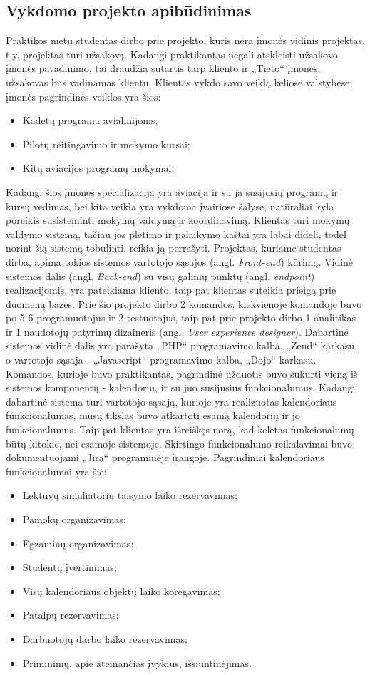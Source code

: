 \documentclass{VUMIFPSbakalaurinis}
\begin{document}
\subsection{Vykdomo projekto apibūdinimas}
Praktikos metu studentas dirbo prie projekto, kuris nėra įmonės vidinis projektas, t.y. projektas turi užsakovą. Kadangi praktikantas negali atskleisti užsakovo įmonės pavadinimo, tai draudžia sutartis tarp kliento ir „Tieto“ įmonės, užsakovas bus vadinamas klientu. Klientas vykdo savo veiklą keliose valstybėse, įmonės pagrindinės veiklos yra šios:
\begin{itemize}
    \item Kadetų programa avialinijoms;
    \item Pilotų reitingavimo ir mokymo kursai;
    \item Kitų aviacijos programų mokymai;
\end{itemize}
Kadangi šios įmonės specializacija yra aviacija ir su ja susijusių programų ir kursų vedimas, bei kita veikla yra vykdoma įvairiose šalyse, natūraliai kyla poreikis susisteminti mokymų valdymą ir koordinavimą. Klientas turi mokymų valdymo sistemą, tačiau jos plėtimo ir palaikymo kaštai yra labai dideli, todėl norint šią sistemą tobulinti, reikia ją perrašyti. Projektas, kuriame studentas dirba, apima tokios sistemos vartotojo sąsajos (angl. \textit{Front-end}) kūrimą. Vidinė sistemos dalis (angl. \textit{Back-end}) su visų galinių punktų (angl. \textit{endpoint}) realizacijomis, yra pateikiama kliento, taip pat klientas suteikia prieigą prie duomenų bazės. Prie šio projekto dirbo 2 komandos, kiekvienoje komandoje buvo po 5-6 programuotojus ir 2 testuotojus, taip pat prie projekto dirbo 1 analitikas ir 1 naudotojų patyrimų dizaineris (angl. \textit{User experience designer}). Dabartinė sistemos vidinė dalis yra parašyta „PHP“ programavimo kalba, „Zend“ karkasu, o vartotojo sąsaja - „Javascript“ programavimo kalba, „Dojo“ karkasu. Komandos, kurioje buvo praktikantas, pagrindinė užduotis buvo sukurti vieną iš sistemos komponentų - kalendorių, ir su juo susijusius funkcionalumus. Kadangi dabartinė sistema turi vartotojo sąsają, kurioje yra realizuotas kalendoriaus funkcionalumas, mūsų tikslas buvo atkartoti esamą kalendorių ir jo funkcionalumus. Taip pat klientas yra išreiškęs norą, kad keletas funkcionalumų būtų kitokie, nei esamoje sistemoje. Skirtingo funkcionalumo reikalavimai buvo dokumentuojami „Jira“ programinėje įrangoje. Pagrindiniai kalendoriaus funkcionalumai yra šie:
\begin{itemize}
    \item Lėktuvų simuliatorių taisymo laiko rezervavimas;
    \item Pamokų organizavimas;
    \item Egzaminų organizavimas;
    \item Studentų įvertinimas;
    \item Visų kalendoriaus objektų laiko koregavimas;
    \item Patalpų rezervavimas;
    \item Darbuotojų darbo laiko rezervavimas;
    \item Priminimų, apie ateinančias įvykius, išsiuntinėjimas.
\end{itemize}
\end{document}
